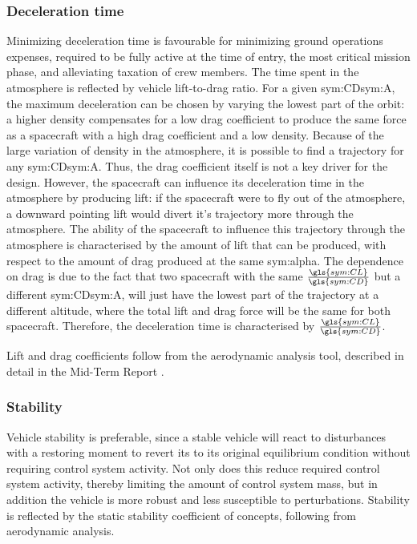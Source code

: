 \subsubsection{Deceleration time}
Minimizing deceleration time is favourable for minimizing ground operations expenses, required to be fully active at the time of entry, the most critical mission phase, and alleviating taxation of crew members. The time spent in the atmosphere is reflected by vehicle lift-to-drag ratio.  For a given \gls{sym:CD}\gls{sym:A}, the maximum deceleration can be chosen by varying the lowest part of the orbit: a higher density compensates for a low drag coefficient to produce the same force as a spacecraft with a high drag coefficient and a low density. Because of the large variation of density in the atmosphere, it is possible to find a trajectory for any \gls{sym:CD}\gls{sym:A}. Thus, the drag coefficient itself is not a key driver for the design. However, the spacecraft can influence its deceleration time in the atmosphere by producing lift: if the spacecraft were to fly out of the atmosphere, a downward pointing lift would divert it's trajectory more through the atmosphere. The ability of the spacecraft to influence this trajectory through the atmosphere is characterised by the amount of lift that can be produced, with respect to the amount of drag produced at the same \gls{sym:alpha}. The dependence on drag is due to the fact that two spacecraft with the same $\frac{\gls{sym:CL}}{\gls{sym:CD}}$ but a different \gls{sym:CD}\gls{sym:A}, will just have the lowest part of the trajectory at a different altitude, where the total lift and drag force will be the same for both spacecraft. Therefore, the deceleration time is characterised by $\frac{\gls{sym:CL}}{\gls{sym:CD}}$. 

Lift and drag coefficients follow from the aerodynamic analysis tool, described in detail in the Mid-Term Report \cite[p.34-46]{Balasooriyan2015b}.

\subsubsection{Stability}
Vehicle stability is preferable, since a stable vehicle will react to disturbances with a restoring moment to revert its to its original equilibrium condition without requiring control system activity. Not only does this reduce required control system activity, thereby limiting the amount of control system mass, but in addition the vehicle is more robust and less susceptible to perturbations. Stability is reflected by the static stability coefficient of concepts, following from aerodynamic analysis.

